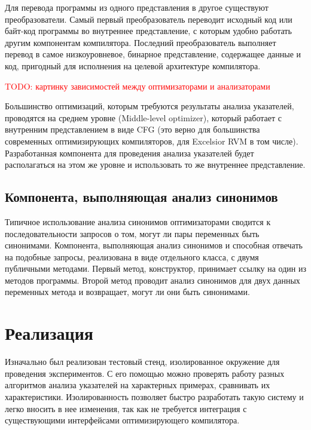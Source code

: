\documentclass[14pt,titlepage]{extarticle}
\newcommand{\todo}[1]{\textcolor{red}{TODO: #1}}
\newcommand{\eng}[1]{{\English#1}}
\let\oldsection\section
\renewcommand{\section}{\newpage\oldsection}
\begin{document}
      Для перевода программы из одного представления в другое существуют
      преобразователи.
      Самый первый преобразователь переводит исходный код или байт-код
      программы во внутреннее представление, с которым удобно работать другим
      компонентам компилятора.
      Последний преобразователь выполняет перевод в самое низкоуровневое,
      бинарное представление, содержащее данные и код, пригодный для исполнения
      на целевой архитектуре компилятора.

      \todo{картинку зависимостей между оптимизаторами и анализаторами}

      Большинство оптимизаций, которым требуются результаты анализа указателей,
      проводятся на среднем уровне (\eng{Middle-level optimizer}), который
      работает с внутренним представлением в виде CFG (это верно для
      большинства современных оптимизирующих компиляторов, для Excelsior RVM в
      том числе). Разработанная компонента для проведения анализа указателей
      будет располагаться на этом же уровне и использовать то же внутреннее
      представление.

    \subsection{Компонента, выполняющая анализ синонимов}
      \label{section:analysis_component}

      Типичное использование анализа синонимов оптимизаторами сводится к
      последовательности запросов о том, могут ли пары переменных быть
      синонимами.
      Компонента, выполняющая анализ синонимов и способная отвечать на подобные
      запросы, реализована в виде отдельного класса, с двумя публичными
      методами.
      Первый метод, конструктор, принимает ссылку на один из методов программы.
      Второй метод проводит анализ синонимов для двух данных переменных метода
      и возвращает, могут ли они быть синонимами.

  \section{Реализация}

    Изначально был реализован тестовый стенд, изолированное окружение для
    проведения экспериментов. С его помощью можно проверять работу
    разных алгоритмов анализа указателей на характерных примерах, сравнивать их
    характеристики. Изолированность позволяет быстро разработать такую систему
    и легко вносить в нее изменения, так как не требуется интеграция с
    существующими интерфейсами оптимизирующего компилятора.
\end{document}

